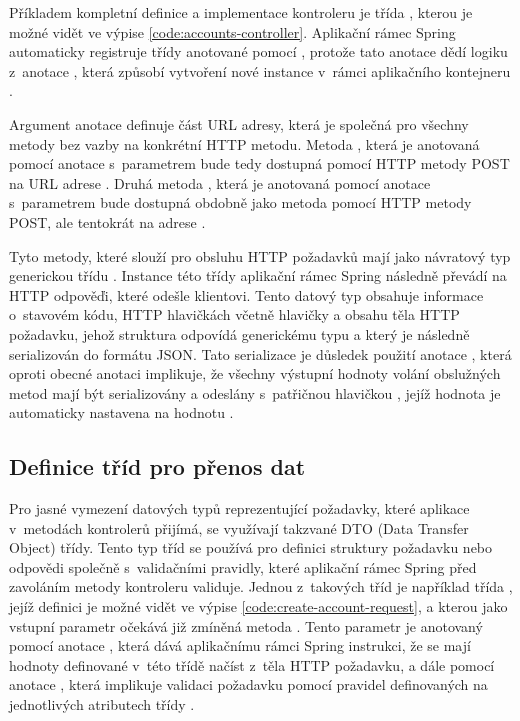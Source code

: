 Příkladem kompletní definice a implementace kontroleru je třída , kterou je možné vidět ve výpise \ref{code:accounts-controller}. Aplikační rámec Spring automaticky registruje třídy anotované pomocí , protože tato anotace dědí logiku z~anotace , která způsobí vytvoření nové instance v~rámci aplikačního kontejneru \cite[kap. 11.1.2]{walls_spring_2019}.

Argument anotace  definuje část URL adresy, která je společná pro všechny metody bez vazby na konkrétní HTTP metodu. Metoda , která je anotovaná pomocí anotace  s~parametrem  bude tedy dostupná pomocí HTTP metody POST na URL adrese . Druhá metoda , která je anotovaná pomocí anotace  s~parametrem  bude dostupná obdobně jako metoda  pomocí HTTP metody POST, ale tentokrát na adrese .

Tyto metody, které slouží pro obsluhu HTTP požadavků mají jako návratový typ generickou třídu . Instance této třídy aplikační rámec Spring následně převádí na HTTP odpověďi, které odešle klientovi. Tento datový typ obsahuje informace o~stavovém kódu, HTTP hlavičkách včetně hlavičky  a obsahu těla HTTP požadavku, jehož struktura odpovídá generickému typu  a který je následně serializován do formátu JSON. Tato serializace je důsledek použití anotace , která oproti obecné anotaci  implikuje, že všechny výstupní hodnoty volání obslužných metod mají být serializovány a odeslány s~patřičnou hlavičkou , jejíž hodnota je automaticky nastavena na hodnotu .

\subsection{Definice tříd pro přenos dat}

Pro jasné vymezení datových typů reprezentující požadavky, které aplikace v~metodách kontrolerů přijímá, se využívají takzvané DTO (Data Transfer Object) třídy. Tento typ tříd se používá pro definici struktury požadavku nebo odpovědi společně s~validačními pravidly, které aplikační rámec Spring před zavoláním metody kontroleru validuje. Jednou z~takových tříd je například třída , jejíž definici je možné vidět ve výpise \ref{code:create-account-request}, a kterou jako vstupní parametr očekává již zmíněná metoda . Tento parametr je anotovaný pomocí anotace , která dává aplikačnímu rámci Spring instrukci, že se mají hodnoty definované v~této třídě načíst z~těla HTTP požadavku, a dále pomocí anotace , která implikuje validaci požadavku pomocí pravidel definovaných na jednotlivých atributech třídy .

